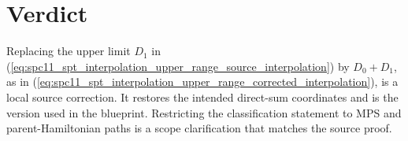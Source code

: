 \documentclass{article}
\begin{document}
\section{Verdict}

Replacing the upper limit $D_1$ in
(\ref{eq:spc11_spt_interpolation_upper_range_source_interpolation}) by
$D_0+D_1$, as in
(\ref{eq:spc11_spt_interpolation_upper_range_corrected_interpolation}), is a
local source correction. It restores the intended direct-sum coordinates and
is the version used in the blueprint. Restricting the classification statement
to MPS and parent-Hamiltonian paths is a scope clarification that matches the
source proof.
\end{document}
